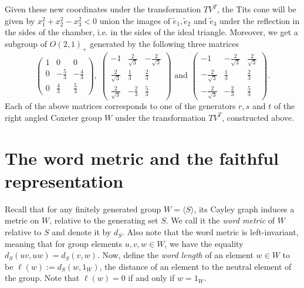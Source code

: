 Given these new coordinates under the transformation \(TV^T\), the Tits cone will be given by \(x_1^2 + x_2^2 - x_3^2 < 0\) union the images of \(\widetilde{e}_1, \widetilde{e}_2\) and \(\widetilde{e}_3\) under the reflection in the sides of the chamber, i.e. in the sides of the ideal triangle. %
Moreover, we get a subgroup of \(O(2,1)_+\) generated by the following three matrices
\begin{equation*}
    \begin{pmatrix} 1 & 0 & 0 \\ 0 & -\frac{5}{3} & -\frac{4}{3} \\ 0 & \frac{4}{3} & \frac{5}{3} \end{pmatrix},\;
    \begin{pmatrix} -1 & \frac{2}{\sqrt{3}} & -\frac{2}{\sqrt{3}} \\ \frac{2}{\sqrt{3}} & \frac{1}{3} & \frac{2}{3} \\ \frac{2}{\sqrt{3}} & -\frac{2}{3} & \frac{5}{3} \end{pmatrix}
    \text{ and }
    \begin{pmatrix} -1 & -\frac{2}{\sqrt{3}} & \frac{2}{\sqrt{3}} \\ -\frac{2}{\sqrt{3}} & \frac{1}{3} & \frac{2}{3} \\ -\frac{2}{\sqrt{3}} & -\frac{2}{3} & \frac{5}{3} \end{pmatrix}.
\end{equation*}
Each of the above matrices corresponds to one of the generators \(r, s\) and \(t\) of the right angled Coxeter group \(W\) under the transformation \(TV^T\), constructed above.


\section{The word metric and the faithful representation}

Recall that for any finitely generated group \(W = \langle S \rangle\), its Cayley graph induces a metric on \(W\), relative to the generating set \(S\).
We call it the \emph{word metric} of \(W\) relative to \(S\) and denote it by \(d_S\).
Also note that the word metric is left-invariant, meaning that for group elements \(u,v,w\in W\), we have the equality \(d_S(uv,uw) = d_S(v,w)\).
Now, define the \emph{word length} of an element \(w\in W\) to be \(\ell(w) := d_S(w, 1_W)\), the distance of an element to the neutral element of the group.
Note that \(\ell(w) = 0\) if and only if \(w = 1_W\).

